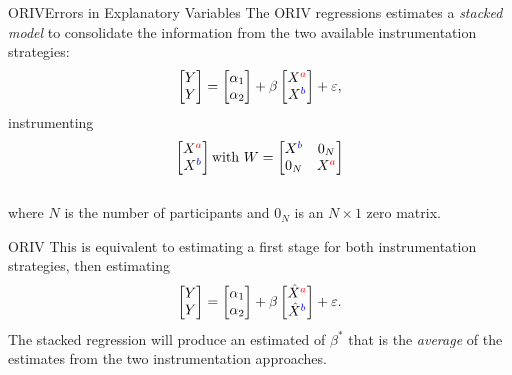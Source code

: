 \begin{frame}{ORIV}{Errors in Explanatory Variables}
The ORIV regressions estimates a \textit{stacked model} to consolidate the information from the two available instrumentation strategies:
    \begin{equation*}
        \begin{bmatrix}
        Y \\ Y \end{bmatrix}
        =
        \begin{bmatrix}
            \alpha_{1} \\ \alpha_{2}
        \end{bmatrix}
        + \beta
        \begin{bmatrix}
            X^{\color{red}a} \\ X^{\color{blue}b}
        \end{bmatrix}
        + \varepsilon,
    \end{equation*}
    instrumenting
    \begin{equation*}
    \begin{bmatrix}
        X^{\color{red}a} \\ X^{\color{blue}b}
    \end{bmatrix}
    \text{with } W=
    \begin{bmatrix}
        X^{\color{blue}b} & 0_{N} \\ 0_{N} & X^{\color{red}a}
    \end{bmatrix}
    \end{equation*}
    \\
    \vspace{3mm}
    where $N$ is the number of participants and $0_{N}$ is an $N\times 1$ zero matrix.
\end{frame}

\begin{frame}{ORIV}
    This is equivalent to estimating a first stage for both instrumentation strategies, then estimating
    \begin{equation*}
        \begin{bmatrix}
        Y \\ Y \end{bmatrix}
        =
        \begin{bmatrix}
            \alpha_{1} \\ \alpha_{2}
        \end{bmatrix}
        + \beta
        \begin{bmatrix}
            \hat{X}^{\color{red}a} \\ \hat{X}^{\color{blue}b}
        \end{bmatrix}
        + \varepsilon.
    \end{equation*}
The stacked regression will produce an estimated of $\beta^{*}$ that is the \textit{average} of the estimates from the two instrumentation approaches.
\end{frame}

